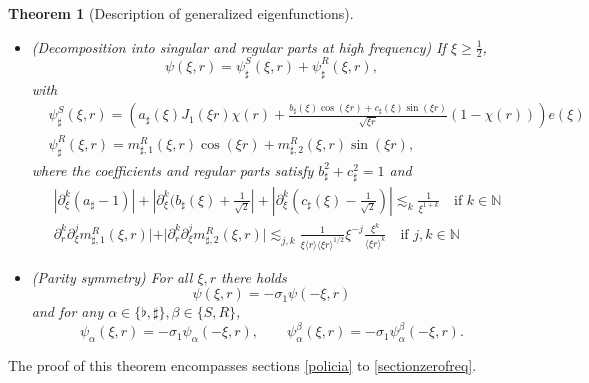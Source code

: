 \documentclass[11 pt]{amsart}
\newtheorem{thm}{Theorem}[section]
\theoremstyle{definition}
\theoremstyle{remark}
\numberwithin{equation}{section}
\begin{document}
\begin{thm}[Description of generalized eigenfunctions]
\begin{itemize}
\item[(ii)](Decomposition into singular and regular parts at high frequency) If $\xi \geqslant \frac{1}{2}$,
\begin{equation} \label{decomposition-psi-sharp}
\psi (\xi, r) = \psi_{\sharp}^S (\xi, r) + \psi_{\sharp}^R (\xi,
     r), 
\end{equation}
with
\begin{align} \label{id:psi-sharp-S}
& \psi_{\sharp}^S (\xi, r) = \left( a_{\sharp}(\xi) J_1 (\xi r) \chi (r) +
     \frac{b_{\sharp} (\xi) \cos (\xi r) + c_{\sharp} (\xi) \sin (\xi
     r)}{\sqrt{\xi r}} (1 - \chi (r)) \right) e (\xi) \\
\label{id:psi-sharp-R} & \psi_{\sharp}^R (\xi, r) = m_{\sharp, 1}^R (\xi, r) \cos (\xi r) +
     m_{\sharp, 2}^R (\xi, r) \sin (\xi r) ,
\end{align}
where the coefficients and regular parts satisfy $b_{\sharp}^2  + c_{\sharp}^2  = 1$ and
\begin{align}
\label{bd:estimates-b-c-sharp}&  |\partial_{\xi}^k (a_{\sharp} - 1) | + | \partial_{\xi}^k (b_{\sharp}
     (\xi) +\frac{1}{\sqrt{2}} | + | \partial_{\xi}^k (c_{\sharp} (\xi) -
     \frac{1}{\sqrt{2}}) | \lesssim_k \frac{1}{\xi^{1 + k}} \quad \mbox{if $k \in \mathbb{N}$} \\
\label{bd:psi-sharp-R} & \partial_r^k \partial_{\xi}^j m_{\sharp, 1}^R (\xi, r) | + |
     \partial_r^k \partial_{\xi}^j m_{\sharp, 2}^R (\xi, r) | \lesssim_{j, k}
     \frac{1}{\xi \langle r \rangle \langle \xi r \rangle^{1/2}} \xi^{- j}
     \frac{\xi^k}{\langle \xi r \rangle^k}  \quad \mbox{if $j,k \in \mathbb{N}$}
\end{align}
\item[(iii)](Parity symmetry) For all $\xi,r$ there holds
$$
\psi (\xi, r) = - \sigma_1 \psi (- \xi, r)
$$
and for any $\alpha \in \{ \flat, \sharp \}, \beta \in \{ S, R \}$,
\[ \psi_{\alpha} (\xi, r) = - \sigma_1 \psi_{\alpha} (- \xi, r),
\qquad
     \psi_{\alpha}^{\beta} (\xi, r) = - \sigma_1 \psi_{\alpha}^{\beta} (- \xi,
     r) . \]
\end{itemize}
\end{thm}


The proof of this theorem encompasses sections \ref{policia} to \ref{sectionzerofreq}.
\end{document}
